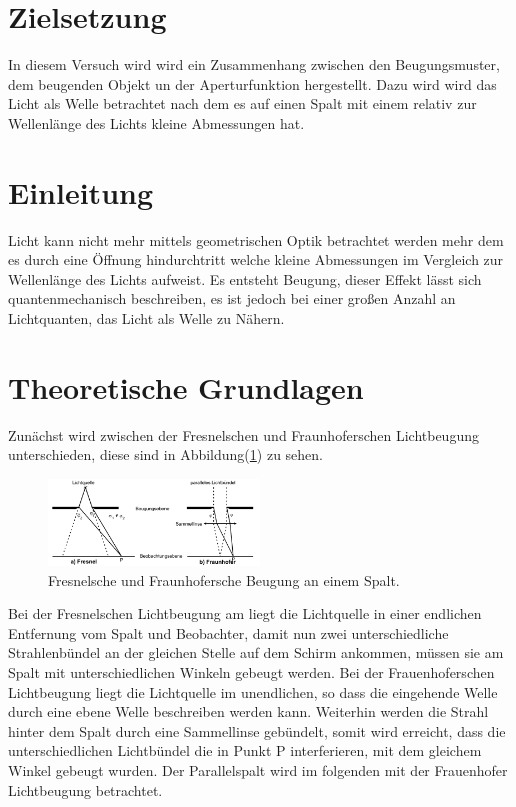 \section{Zielsetzung}

    \noindent In diesem Versuch wird wird ein Zusammenhang zwischen den Beugungsmuster, dem beugenden Objekt un der Aperturfunktion hergestellt.
    Dazu wird wird das Licht als Welle betrachtet nach dem es auf einen Spalt mit einem relativ zur Wellenlänge des Lichts kleine Abmessungen hat.

\section{Einleitung}

    \noindent Licht kann nicht mehr mittels geometrischen Optik betrachtet werden mehr dem es durch eine Öffnung hindurchtritt welche kleine 
    Abmessungen im Vergleich zur Wellenlänge des Lichts aufweist. Es entsteht Beugung, dieser Effekt lässt sich quantenmechanisch beschreiben, 
    es ist jedoch bei einer großen Anzahl an Lichtquanten, das Licht als Welle zu Nähern. 

\section{Theoretische Grundlagen}

    \noindent Zunächst wird zwischen der Fresnelschen und Fraunhoferschen Lichtbeugung unterschieden, diese sind in Abbildung(\ref{img:fresnel}) 
    zu sehen. 

    \begin{figure}[ht]
        \centering
        \includegraphics[width=0.5\textwidth]{latex/images/fresnel.PNG}
        \caption{Fresnelsche und Fraunhofersche Beugung an einem Spalt\protect \cite{V406}.}
        \label{img:fresnel}
    \end{figure}

    \noindent Bei der Fresnelschen Lichtbeugung am liegt die Lichtquelle in einer endlichen Entfernung vom Spalt und Beobachter, 
    damit nun zwei unterschiedliche Strahlenbündel an der gleichen Stelle auf dem Schirm ankommen, müssen sie am Spalt mit unterschiedlichen 
    Winkeln gebeugt werden. Bei der Frauenhoferschen Lichtbeugung liegt die Lichtquelle im unendlichen, so dass die eingehende Welle durch 
    eine ebene Welle beschreiben werden kann. Weiterhin werden die Strahl hinter dem Spalt durch eine Sammellinse gebündelt, somit wird 
    erreicht, dass die unterschiedlichen Lichtbündel die in Punkt P interferieren, mit dem gleichem Winkel gebeugt wurden. Der Parallelspalt 
    wird im folgenden mit der Frauenhofer Lichtbeugung betrachtet.

